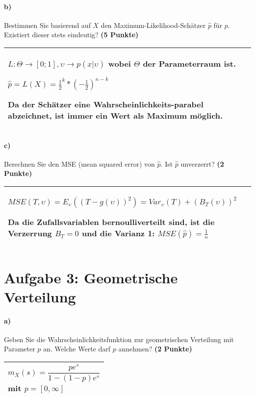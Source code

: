 \documentclass[10pt, a4paper]{article}
\begin{document}
\paragraph{b)} Bestimmen Sie basierend auf $X$ den Maximum-Likelihood-Schätzer $\hat{p}$ für $p$. Existiert dieser stets eindeutig? \textbf{(5 Punkte)}\\
\begin{tabular}{| p{17cm} |}
    \hline
    $L:\Theta\rightarrow [0;1],\upsilon\rightarrow p(x|\upsilon)$ wobei $\Theta$ der Parameterraum ist.

    $\hat{p}= L(X)=\frac{1}{2}^k *(-\frac{1}{2})^{n-k}$

    Da der Schätzer eine Wahrscheinlichkeits-parabel abzeichnet, ist immer ein Wert als Maximum möglich.
    \\\hline
\end{tabular}

\paragraph{c)} Berechnen Sie den MSE (mean squared error) von $\hat{p}$. Ist $\hat{p}$ unverzerrt? \textbf{(2 Punkte)}\\
\begin{tabular}{| p{17cm} |}
    \hline
    $MSE(T,\upsilon)=E_{\upsilon}((T-g(\upsilon))^2) = Var_{\upsilon}(T)+(B_T(\upsilon))^2$

    Da die Zufallsvariablen bernoulliverteilt sind, ist die Verzerrung $B_T=0$ und die Varianz 1: $MSE(\hat{p})=\frac{1}{n}$

    \\\hline
\end{tabular}


\section{Aufgabe 3: Geometrische Verteilung}
\paragraph{a)} Geben Sie die Wahrscheinlichkeitsfunktion zur geometrischen Verteilung mit Parameter $p$ an. Welche Werte darf $p$ annehmen? \textbf{(2 Punkte)}\\
\begin{tabular}{| p{17cm} |}
    \hline
    $$m_X(s)=\frac{pe^s}{1-(1-p)e^s}$$ mit $p=[0,\infty]$
    \\\hline
\end{tabular}
\end{document}

